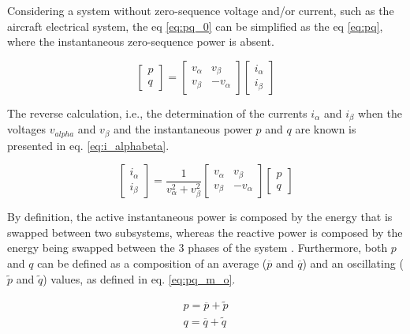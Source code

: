 Considering a system without zero-sequence voltage and/or current, such as the aircraft electrical system, the eq \ref{eq:pq_0} can be simplified as the eq \ref{eq:pq}, where the instantaneous zero-sequence power is absent.

\begin{equation}
\begin{bmatrix}
p\\
q
\end{bmatrix}=
\begin{bmatrix}
v_{\alpha}	&	v_{\beta}\\
v_{\beta}	&	-v_{\alpha}
\end{bmatrix}
\begin{bmatrix}
i_{\alpha}\\
i_{\beta}
\end{bmatrix}
\label{eq:pq}
\end{equation} 

The reverse calculation, i.e., the determination of the currents $i_{\alpha}$ and $i_{\beta}$ when the voltages $v_{alpha}$ and $v_{\beta}$ and the instantaneous power $p$ and $q$ are known is presented in eq. \ref{eq:i_alphabeta}.

\begin{equation}
\begin{bmatrix}
i_{\alpha}\\
i_{\beta}
\end{bmatrix}=
\dfrac{1}{v_{\alpha}^2+v_{\beta}^2}
\begin{bmatrix}
v_{\alpha}	&	v_{\beta}\\
v_{\beta}	&	-v_{\alpha}
\end{bmatrix}
\begin{bmatrix}
p\\
q
\end{bmatrix}
\label{eq:i_alphabeta}
\end{equation}

By definition, the active instantaneous power is composed by the energy that is swapped between two subsystems, whereas the reactive power is composed by the energy being swapped between the 3 phases of the system \citep{Akagi1984,Peng1996}. Furthermore, both $p$ and $q$ can be defined as a composition of an average ($\overline{p}$ and $\overline{q}$) and an oscillating ($\tilde{p}$ and $\tilde{q}$) values, as defined in eq. \ref{eq:pq_m_o}.

\begin{equation}
\begin{aligned}
p = \overline{p} + \tilde{p}\\
q = \overline{q} + \tilde{q} 
\end{aligned}
\label{eq:pq_m_o}
\end{equation} 

